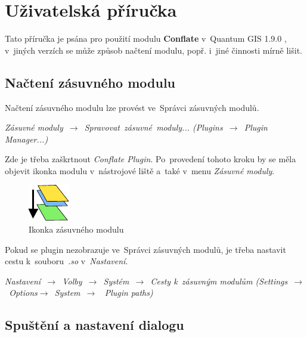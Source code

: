 \chapter{Uživatelská příručka}
\label{priloha-prirucka}

Tato příručka je psána pro použití modulu \textbf{Conflate} v~Quantum GIS 1.9.0 , 
v~jiných verzích se může způsob načtení modulu, popř. i~jiné činnosti mírně lišit.


\section{Načtení zásuvného modulu}
\label{prirucka-nacteni}

Načtení zásuvného modulu lze provést ve~Správci zásuvných modulů.
\begin{center}
\textit{Zásuvné moduly~$\rightarrow$~Spravovat~zásuvné~moduly... 
(Plugins~$\rightarrow$~Plugin Manager...)}
\end{center}
Zde je třeba zaškrtnout \textit{Conflate Plugin}. Po~provedení tohoto kroku by se 
měla objevit ikonka modulu v~nástrojové liště a~také v~menu \textit{Zásuvné moduly}. 

  \begin{figure}[H]
    \centering
      \includegraphics{./pictures/mActionConflate.pdf}
      \caption{Ikonka zásuvného modulu}
      \label{fig:ikonka}
  \end{figure}

Pokud se plugin nezobrazuje ve~Správci zásuvných modulů, je třeba nastavit cestu 
k~souboru~\textit{.so} v~\textit{Nastavení}.
\begin{center} 
\textit{Nastavení~$\rightarrow$~Volby~$\rightarrow$~Systém~$\rightarrow$~Cesty 
k~zásuvným modulům (Settings~$\rightarrow$~Options$\rightarrow$~System~$\rightarrow$
~Plugin paths)}
\end{center}


\section{Spuštění a nastavení dialogu}
\label{prirucka-spusteni}

